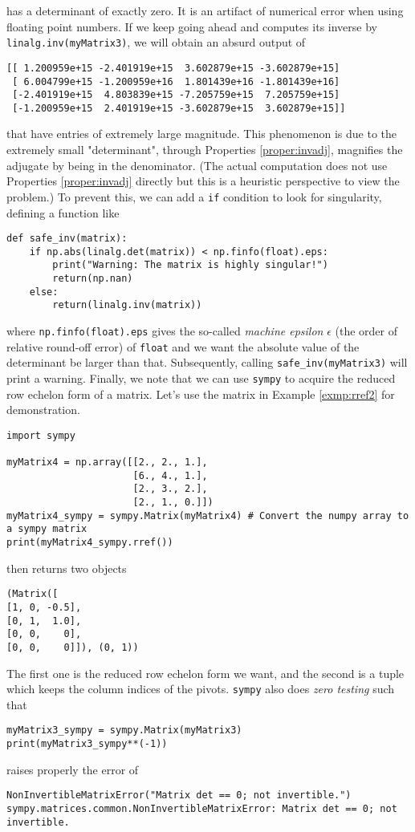 has a determinant of exactly zero. It is an artifact of numerical error when using floating point numbers. If we keep going ahead and computes its inverse by \verb|linalg.inv(myMatrix3)|, we will obtain an absurd output of
\begin{lstlisting}
[[ 1.200959e+15 -2.401919e+15  3.602879e+15 -3.602879e+15]
 [ 6.004799e+15 -1.200959e+16  1.801439e+16 -1.801439e+16]
 [-2.401919e+15  4.803839e+15 -7.205759e+15  7.205759e+15]
 [-1.200959e+15  2.401919e+15 -3.602879e+15  3.602879e+15]]
\end{lstlisting}
that have entries of extremely large magnitude. This phenomenon is due to the extremely small "determinant", through Properties \ref{proper:invadj}, magnifies the adjugate by being in the denominator. (The actual computation does not use Properties \ref{proper:invadj} directly but this is a heuristic perspective to view the problem.) To prevent this, we can add a \verb|if| condition to look for singularity, defining a function like
\begin{lstlisting}
def safe_inv(matrix):
    if np.abs(linalg.det(matrix)) < np.finfo(float).eps:
        print("Warning: The matrix is highly singular!")
        return(np.nan)
    else:
        return(linalg.inv(matrix))
\end{lstlisting}
where \verb|np.finfo(float).eps| gives the so-called \textit{machine epsilon} $\epsilon$ (the order of relative round-off error) of \verb|float| and we want the absolute value of the determinant be larger than that. Subsequently, calling \verb|safe_inv(myMatrix3)| will print a warning. Finally, we note that we can use \verb|sympy| to acquire the reduced row echelon form of a matrix. Let's use the matrix in Example \ref{exmp:rref2} for demonstration.
\begin{lstlisting}
import sympy

myMatrix4 = np.array([[2., 2., 1.],
                      [6., 4., 1.],
                      [2., 3., 2.],
                      [2., 1., 0.]])
myMatrix4_sympy = sympy.Matrix(myMatrix4) # Convert the numpy array to a sympy matrix
print(myMatrix4_sympy.rref())
\end{lstlisting}
then returns two objects
\begin{lstlisting}
(Matrix([
[1, 0, -0.5],
[0, 1,  1.0],
[0, 0,    0],
[0, 0,    0]]), (0, 1))    
\end{lstlisting}
The first one is the reduced row echelon form we want, and the second is a tuple which keeps the column indices of the pivots. \verb|sympy| also does \textit{zero testing} such that
\begin{lstlisting}
myMatrix3_sympy = sympy.Matrix(myMatrix3)
print(myMatrix3_sympy**(-1))    
\end{lstlisting}
raises properly the error of
\begin{lstlisting}
NonInvertibleMatrixError("Matrix det == 0; not invertible.") sympy.matrices.common.NonInvertibleMatrixError: Matrix det == 0; not invertible. 
\end{lstlisting}

